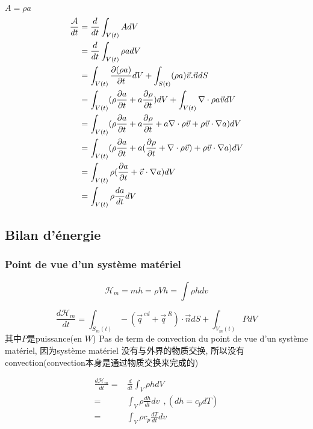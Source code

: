 \documentclass{article}
\begin{document}
\begin{example}
$A = \rho a$
$$
\begin{aligned}
\dfrac{\mathcal{A}}{dt} 
& = \dfrac{d}{dt} \int_{V(t)} A dV \\
& = \dfrac{d}{dt} \int_{V(t)} \rho a dV \\
& = \int_{V(t)} \frac{\partial (\rho a)}{\partial t}dV + \int_{S(t)} (\rho a) \vec{v} . \vec{n}dS \\
& = \int_{V(t)} (\rho \frac{\partial a}{\partial t} + a \frac{\partial \rho}{\partial t})dV + \int_{V(t)} \nabla \cdot \rho a \vec{v}dV \\
& = \int_{V(t)} (\rho \frac{\partial a}{\partial t} + a \frac{\partial \rho}{\partial t} + a \nabla \cdot \rho \vec{v} + \rho \vec{v}\cdot \nabla a)dV \\
& = \int_{V(t)} (\rho \frac{\partial a}{\partial t} + a (\frac{\partial \rho}{\partial t} + \nabla \cdot \rho \vec{v}) + \rho \vec{v}\cdot \nabla a)dV \\
& = \int_{V(t)} \rho (\frac{\partial a}{\partial t} + \vec{v} \cdot \nabla a)dV \\
& = \int_{V(t)} \rho \frac{da}{dt}dV
\end{aligned}
$$
\end{example}

\subsection{Bilan d'\'energie}
\subsubsection{Point de vue d'un syst\`eme mat\'eriel}
$$\mathcal{H}_m = mh=\rho V h=\int \rho h dv$$

\begin{equation}
\dfrac{d \mathcal{H}_m}{dt} = \int_{S_m(t)} -(\vec{q}^{\ cd} + \vec{q}^{\ R})\cdot \vec{n}dS + \int_{V_m(t)} P dV
\end{equation}
其中$P$是puissance(en $W$)
Pas de term de convection du point de vue d'un syst\`eme mat\'eriel, 
因为syst\`eme mat\'eriel 没有与外界的物质交换, 所以没有convection(convection本身是通过物质交换来完成的)

\begin{equation}
 	\begin{split}
	\frac{ d\mathcal{H}_m}{dt}
	= & \frac{d}{dt} \int_V \rho h dV\\
	= & \int_V \rho \frac{dh}{dt}dv \ \ ,(dh = c_pdT)\\
	 = & \int_V \rho c_p\frac{dT}{dt}dv
	\end{split}
\end{equation}
\end{document}

